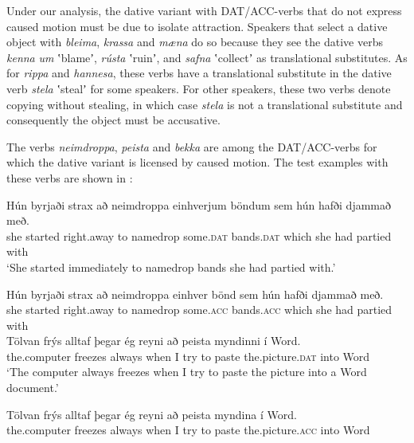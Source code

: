\documentclass[output=paper,modfonts,nonflat,colorlinks,citecolor=brown]{langsci/langscibook}
\begin{document}
{Under our analysis, the dative variant with DAT/ACC-verbs that do not express caused motion must be due to isolate attraction. Speakers that select a dative object with \textit{bleima}, \textit{krassa} and \textit{mæna} do so because they see the dative verbs \textit{kenna} \textit{um} ʽblameʼ, \textit{rústa} ʽruinʼ, and \textit{safna} ʽcollectʼ as translational substitutes. As for \textit{rippa} and \textit{hannesa}, these verbs have a translational substitute in the dative verb \textit{stela} ʽstealʼ for some speakers. For other speakers, these two verbs denote copying without stealing, in which case \textit{stela} is not a translational substitute and consequently the object must be accusative. 

The verbs \textit{neimdroppa}, \textit{peista} and \textit{bekka} are among the DAT/ACC-verbs for which the dative variant is licensed by caused motion. The test examples with these verbs are shown in :

 
\ea%
\label{ex:jonsson:7}
\ea\label{ex:jonsson:7a} 
\gll  Hún  byrjaði  strax  að  neimdroppa  einhverjum  böndum  sem  hún  hafði  djammað  með.\\
   she  started  right.away  to  namedrop  some.\textsc{dat}  bands.\textsc{dat}  which  she  had  partied  with\\
\glt `She started immediately to namedrop bands she had partied with.'
 
 
\ex\label{ex:jonsson:7b}
\gll   Hún  byrjaði  strax  að  neimdroppa  einhver  bönd  sem  hún  hafði  djammað  með.\\
 she  started  right.away  to  namedrop  some.\textsc{acc}  bands.\textsc{acc}  which  she  had  partied  with\\
 
 
\ex\label{ex:jonsson:7c}
\gll   Tölvan  frýs  alltaf  þegar  ég  reyni  að  peista  myndinni  í  Word.  \\
 the.computer  freezes  always  when  I  try  to  paste  the.picture.\textsc{dat}  into  Word  \\
\glt `The computer always freezes when I try to paste the picture into a Word document.'
  
\ex\label{ex:jonsson:7d}
\gll   Tölvan  frýs  alltaf  þegar  ég  reyni  að  peista  myndina  í  Word.\\
 the.computer  freezes  always  when  I  try  to  paste  the.picture.\textsc{acc}  into  Word\\
 

}
\end{document}
